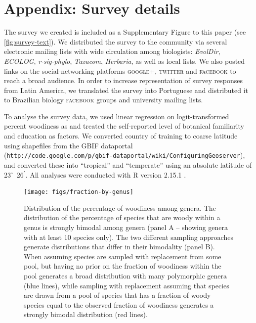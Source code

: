 \documentclass[a4paper,12pt]{article}
\begin{document}
\section{Appendix: Survey details}
%
The survey we created is included as a Supplementary Figure to
this paper (see \ref{fig:survey-text}). We distributed the survey to the 
community via several electronic
mailing lists with wide circulation among biologists: \emph{EvolDir},
\emph{ECOLOG}, \emph{\mbox{r-sig-phylo}}, \emph{Taxacom},
\emph{Herbaria}, as well as local lists. We also posted links on the
social-networking platforms \textsc{google+}, \textsc{twitter} and
\textsc{facebook} to reach a broad audience.
%
In order to increase representation of survey responses from Latin
America, we translated the survey into Portuguese and distributed it
to Brazilian biology \textsc{facebook} groups and university mailing
lists.

To analyse the survey data, we used linear regression on
logit-transformed percent woodiness as \citep[see][]{wartonarcsine}
and treated the self-reported level of botanical familiarity and
education as factors.  We converted country of training to coarse
latitude using shapefiles
from the GBIF dataportal\\
(\texttt{http://code.google.com/p/gbif-dataportal/wiki/ConfiguringGeoserver}),
and converted these into ``tropical'' and ``temperate'' using an
absolute latitude of 23$^\circ$~26$^\prime$.  All analyses were
conducted with R version 2.15.1 \citep{R}.





\begin{figure}[p]
  \centering
  \texttt{[image: figs/fraction-by-genus]}
  \caption{Distribution of the percentage of woodiness among genera.
    The distribution of the percentage of species that are woody within
    a genus is strongly bimodal among genera (panel A -- showing
    genera with at least 10 species only).
    The two different sampling approaches generate distributions that
    differ in their bimodality (panel B). When assuming species are
    sampled with replacement from some pool, but having no prior on
    the fraction of woodiness within the pool generates a broad
    distribution with many polymorphic genera (blue lines), while
    sampling with replacement assuming that species are drawn from a
    pool of species that has a fraction of woody species equal to the
    observed fraction of woodiness generates a strongly bimodal
    distribution (red lines).}
  \label{fig:distribution-genera}
\end{figure}
\end{document}
